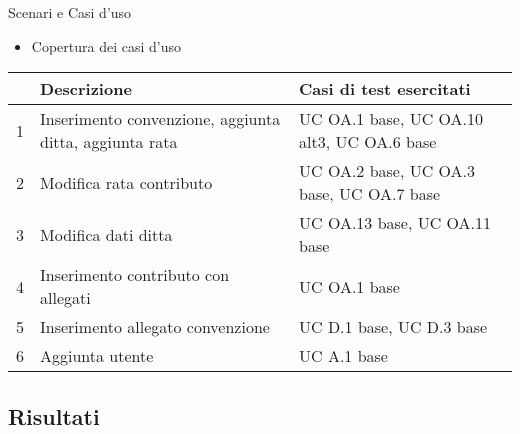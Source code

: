 \begin{frame}{Scenari e Casi d'uso}

\begin{itemize}
\item Copertura dei casi d'uso
\end{itemize}

\begin{center}
\footnotesize
\begin{tabular}{| c | p{4.5cm} | p{4cm} |} 
    \hline
     & Descrizione & Casi di test esercitati \\
    \hline
    1 & Inserimento convenzione,\newline
    aggiunta ditta,
    aggiunta rata & UC OA.1 base,
    UC OA.10 alt3,\newline
    UC OA.6 base\\
    \hline
    2 & Modifica rata contributo & UC OA.2 base,
    UC OA.3 base, \newline
    UC OA.7 base  \\
    \hline
    3 & Modifica dati ditta & UC OA.13 base,\newline
    UC OA.11 base \\
    \hline
    4 & Inserimento contributo con allegati & UC OA.1 base\\
    \hline
    5 & Inserimento allegato convenzione & UC D.1 base,
    UC D.3 base\\
    \hline
    6 & Aggiunta utente & UC A.1 base\\
    \hline
  \end{tabular} 
\end{center}

\end{frame}

\subsection{Risultati}

